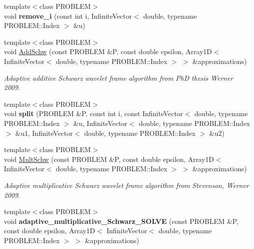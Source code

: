 \begin{CompactItemize}
\item 
\hypertarget{namespaceFrameTL_4c6e64c8471915c044140f434fd54372}{
{\footnotesize template$<$class PROBLEM$>$ }\\void \textbf{remove\_\-i} (const int i, InfiniteVector$<$ double, typename PROBLEM::Index $>$ \&u)}
\label{namespaceFrameTL_4c6e64c8471915c044140f434fd54372}

\item 
{\footnotesize template$<$class PROBLEM$>$ }\\void \hyperlink{namespaceFrameTL_fae0f5be715e2324d15ca01a18665855}{AddSchw} (const PROBLEM \&P, const double epsilon, Array1D$<$ InfiniteVector$<$ double, typename PROBLEM::Index $>$ $>$ \&approximations)
\begin{CompactList}\small\item\em Adaptive additive Schwarz wavelet frame algorithm from PhD thesis Werner 2009. \item\end{CompactList}\item 
\hypertarget{namespaceFrameTL_9af3764c23011a0c0d4ceb60995cae01}{
{\footnotesize template$<$class PROBLEM$>$ }\\void \textbf{split} (PROBLEM \&P, const int i, const InfiniteVector$<$ double, typename PROBLEM::Index $>$ \&u, InfiniteVector$<$ double, typename PROBLEM::Index $>$ \&u1, InfiniteVector$<$ double, typename PROBLEM::Index $>$ \&u2)}
\label{namespaceFrameTL_9af3764c23011a0c0d4ceb60995cae01}

\item 
{\footnotesize template$<$class PROBLEM$>$ }\\void \hyperlink{namespaceFrameTL_a6fc7f7f5f218c3dc3e34081b4e7464d}{MultSchw} (const PROBLEM \&P, const double epsilon, Array1D$<$ InfiniteVector$<$ double, typename PROBLEM::Index $>$ $>$ \&approximations)
\begin{CompactList}\small\item\em Adaptive multiplicative Schwarz wavelet frame algorithm from Stevenson, Werner 2009. \item\end{CompactList}\item 
\hypertarget{namespaceFrameTL_3ee8bc795a39cbc2a1084ff7f9735da1}{
{\footnotesize template$<$class PROBLEM$>$ }\\void \textbf{adaptive\_\-multiplicative\_\-Schwarz\_\-SOLVE} (const PROBLEM \&P, const double epsilon, Array1D$<$ InfiniteVector$<$ double, typename PROBLEM::Index $>$ $>$ \&approximations)}
\label{namespaceFrameTL_3ee8bc795a39cbc2a1084ff7f9735da1}


\end{CompactItemize}
